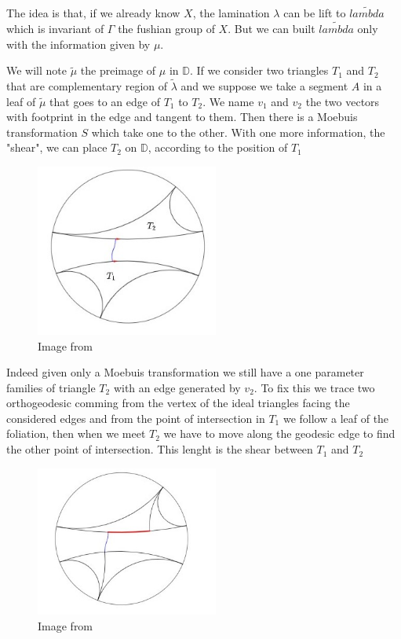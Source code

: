 The idea is that, if we already know $X$, the lamination $\lambda$ can be lift to $\tilde{lambda}$ which is invariant of $\Gamma$ the fushian group of $X$. But we can built $\tilde{lambda}$ only with the information given by $\mu$.

We will note $\tilde{\mu}$ the preimage of $\mu$ in $\mathbb{D}$. If we consider two triangles $T_1$ and $T_2$  that are complementary region of $\tilde{\lambda}$ and we suppose we take a segment $A$ in a leaf of $\tilde{\mu}$ that goes to an edge of $T_1$ to $T_2$. We name $v_1$ and $v_2$ the two vectors with footprint in the edge and tangent to them. Then there is a Moebuis transformation $S$ which take one to the other. With one more information, the "shear", we can place $T_2$ on $\mathbb{D}$, according to the position of $T_1$

\begin{figure}[h!]
\centering
\includegraphics[width=6cm]{Image/Foliation.jpg}
\caption{Image from \cite{wright2018mirzakhani}}
\end{figure}

Indeed given only a Moebuis transformation we still have a one parameter families of triangle $T_2$ with an edge generated by $v_2$. To fix this we trace two orthogeodesic comming from the vertex of the ideal triangles facing the considered edges and from the point of intersection in $T_1$ we follow a leaf of the foliation, then when we meet $T_2$ we have to move along the geodesic edge to find the other point of intersection. This lenght is the shear between $T_1$ and $T_2$

\begin{figure}[h!]
\centering
\includegraphics[width=6cm]{Image/Shear.jpg}
\caption{Image from \cite{wright2018mirzakhani}}
\end{figure}

